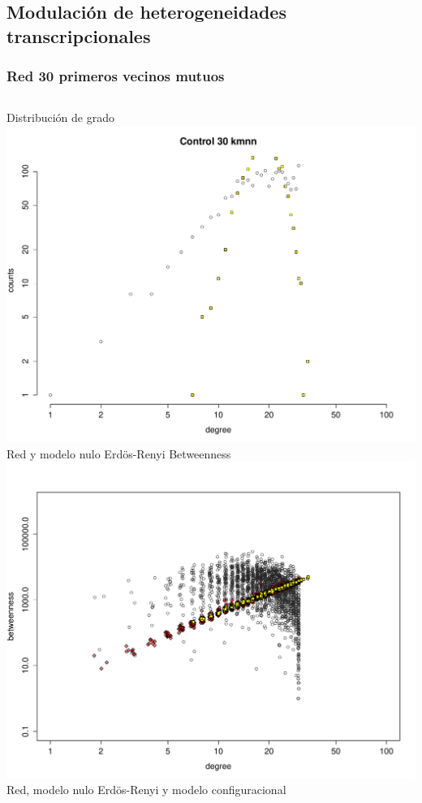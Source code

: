 \documentclass[serif,9pt, t]{beamer}
\begin{document}
\subsection{Modulación de heterogeneidades
transcripcionales}
\begin{frame}\frametitle{Red 30 primeros vecinos mutuos} 
\bigskip
\begin{columns}[T]
	\centering
    Distribución de grado\\	
    \bigskip
    \includegraphics[width=1\textwidth]{erdos_renyi_vs_30kmnn.pdf}\\
    Red y modelo nulo Erdös-Renyi
    \centering
    Betweenness\\
    \bigskip
    \includegraphics[width=1\textwidth]{betweenness_er_30_conf.pdf}\\
    Red, modelo nulo Erdös-Renyi y modelo configuracional
\end{columns}
\end{frame}
\end{document}
